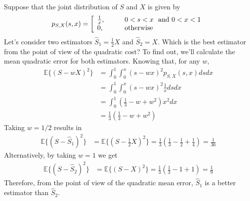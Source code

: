 {
\begin{example}
\label{CalculoECM}
Suppose that the joint distribution of $S$ and $X$ is given by
\begin{equation}
p_{S,X}(s,x) = \left[
\begin{array}{ll}
\frac{1}{x}, & \qquad 0<s<x ~~{\rm and}~0<x<1 \\
0,           & \qquad \text{otherwise}
\end{array}
\right.
\end{equation}
Let's consider two estimators $\hat{S}_1 = \frac{1}{2}X$ and $\hat{S}_2 = X$. \textquestiondown Which is the best estimator from the point of view of the quadratic cost? To find out, we'll calculate the mean quadratic error for both estimators.
Knowing that, for any $w$,
\begin{align}
\mathbb{E}\{(S-wX)^2\}   
 &= \int_0^1 \int_0^x (s-wx)^2 p_{S,X}(s,x) ds dx   \nonumber\\
 &= \int_0^1 \int_0^x (s-wx)^2 \frac{1}{x}ds dx   \nonumber\\
 &= \int_0^1 \left(\frac{1}{3} - w  + w^2 \right) x^2 dx  \nonumber\\
 &= \frac{1}{3}\left(\frac{1}{3} - w  + w^2 \right) 
\end{align}
Taking $w=1/2$ results in
\begin{align}
\mathbb{E}\{(S-\hat{S}_1)^2\} & = \mathbb{E}\{(S-\frac{1}{2}X)^2\}   
 = \frac{1}{3}\left(\frac{1}{3} - \frac{1}{2}  + \frac{1}{4} \right) = \frac{1}{36}
\end{align}
Alternatively, by taking $w=1$ we get
\begin{align}
\mathbb{E}\{(S-\hat{S}_2)^2\} & = \mathbb{E}\{(S-X)^2\}   
 = \frac{1}{3}\left(\frac{1}{3} - 1  + 1 \right) = \frac{1}{9}
\end{align}
Therefore, from the point of view of the quadratic mean error, $\hat{S}_1$ is a better estimator than $\hat{S}_2$.
\end{example}\vspace{0.4cm}}



